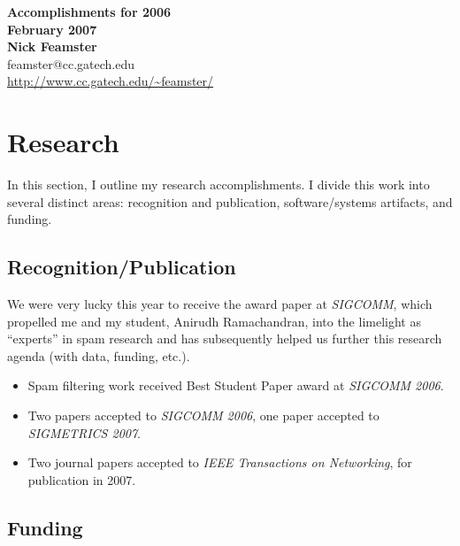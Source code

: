 \newpage 

\setcounter{page}{1}

\setcounter{page}{1}
\begin{center}
{\Large\textbf{Accomplishments for 2006 \\ February 2007}}\\[.1in]
{\large\textbf{Nick Feamster}}\\[.05in]
feamster@cc.gatech.edu \\
\url{http://www.cc.gatech.edu/~feamster/} \\[.1in]
\end{center}

\begin{sloppypar}

\section*{Research}

In this section, I outline my research accomplishments.  I divide this
work into several distinct areas: recognition and publication,
software/systems artifacts, and funding.

\subsection*{Recognition/Publication}

We were very lucky this year to receive the award paper at {\em
SIGCOMM}, which propelled me and my student, Anirudh Ramachandran, into
the limelight as ``experts'' in spam research and has subsequently
helped us further this research agenda (with data, funding, etc.).

\begin{itemize}
\itemsep=-1pt
\item Spam filtering work received Best Student Paper award at {\em
  SIGCOMM 2006}.
\item Two papers accepted to {\em SIGCOMM 2006}, one paper accepted to
  {\em SIGMETRICS 2007}. 
\item Two journal papers accepted to {\em IEEE Transactions on
  Networking}, for publication in 2007.
\end{itemize}

\subsection*{Funding}


\end{sloppypar}
